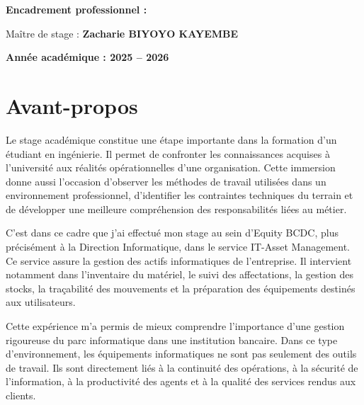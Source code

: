 \documentclass[12pt,a4paper]{report}
\begin{document}
\begin{titlepage}
\begin{flushleft}
        {\bfseries Encadrement professionnel :\par}
        Maître de stage : \textbf{Zacharie BIYOYO KAYEMBE}
        
    \end{flushleft}
    
    \vfill
    
    {\bfseries\large Année académique : 2025 -- 2026\par}
    
\end{titlepage}


\chapter*{Avant-propos}

Le stage académique constitue une étape importante dans la formation d'un étudiant en ingénierie. Il permet de confronter les connaissances acquises à l'université aux réalités opérationnelles d'une organisation. Cette immersion donne aussi l'occasion d'observer les méthodes de travail utilisées dans un environnement professionnel, d'identifier les contraintes techniques du terrain et de développer une meilleure compréhension des responsabilités liées au métier.

C'est dans ce cadre que j'ai effectué mon stage au sein d'Equity BCDC, plus précisément à la Direction Informatique, dans le service IT-Asset Management. Ce service assure la gestion des actifs informatiques de l'entreprise. Il intervient notamment dans l'inventaire du matériel, le suivi des affectations, la gestion des stocks, la traçabilité des mouvements et la préparation des équipements destinés aux utilisateurs.

Cette expérience m'a permis de mieux comprendre l'importance d'une gestion rigoureuse du parc informatique dans une institution bancaire. Dans ce type d'environnement, les équipements informatiques ne sont pas seulement des outils de travail. Ils sont directement liés à la continuité des opérations, à la sécurité de l'information, à la productivité des agents et à la qualité des services rendus aux clients.
\end{document}
